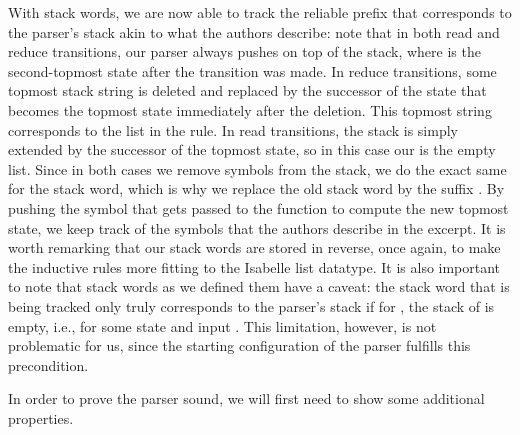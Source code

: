 \begin{isabellebody}
\begin{isamarkuptext}
With stack words, we are now able to track the reliable prefix that corresponds to the parser's stack
akin to what the authors describe: note that in both read and reduce transitions, our parser always
pushes  on top of the stack, where  is the second-topmost state after 
the transition was made. In reduce transitions, some topmost stack string is deleted and replaced by
the successor of the state that becomes the topmost state immediately after the deletion. 
This topmost string corresponds to the list  in the  rule. In read transitions, the stack
is simply extended by the successor of the topmost state, so in this case our  is the empty list.
Since in 
both cases we remove  symbols from the stack, we do the exact same for the stack 
word, which is why we replace the old stack word \isa{{\isasymalpha}} by the suffix . By 
pushing the symbol  that gets passed to the  function to compute the new topmost state, we
keep track of the symbols that the authors describe in the excerpt. It is worth remarking that our 
stack words are stored in reverse, once again, to make the inductive rules more fitting to the
Isabelle list datatype. It is also important to note that stack words as we defined them have a 
caveat: the stack word that is being tracked only truly corresponds to the parser's stack if 
for , the stack of  is empty, i.e.,  for some state 
 and input . This limitation, however, is not problematic for us, since the starting 
configuration of the parser fulfills this precondition.

In order to prove the parser sound, we will first need to show some additional properties.


\end{isamarkuptext}
\end{isabellebody}
